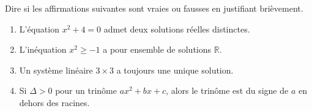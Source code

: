 \documentclass[11pt]{article}
\begin{document}
\begin{exercice}
Dire si les affirmations suivantes sont vraies ou fausses en justifiant brièvement.
\begin{enumerate}
    \item L'équation $x^2 + 4 = 0$ admet deux solutions réelles distinctes.
    \item L'inéquation $x^2 \geq -1$ a pour ensemble de solutions $\mathbb{R}$.
    \item Un système linéaire $3 \times 3$ a toujours une unique solution.
    \item Si $\Delta > 0$ pour un trinôme $ax^2+bx+c$, alors le trinôme est du signe de $a$ en dehors des racines.
\end{enumerate}
\end{exercice}
\end{document}
